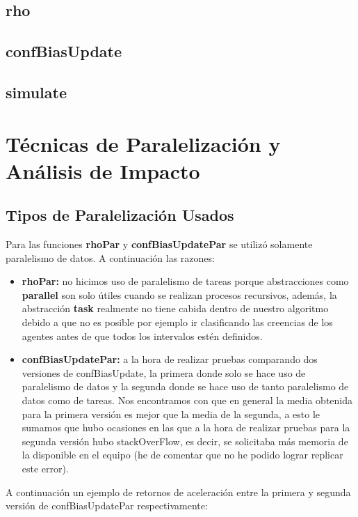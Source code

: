 \documentclass{article}
\begin{document}
    \subsection{rho}

    \subsection{confBiasUpdate}

    \subsection{simulate}

  \section{Técnicas de Paralelización y Análisis de Impacto}

    \subsection{Tipos de Paralelización Usados}
    Para las funciones \textbf{rhoPar} y \textbf{confBiasUpdatePar} se utilizó solamente paralelismo de datos. A continuación  las razones:

    \begin{itemize}
      \item \textbf{rhoPar:} no hicimos uso de paralelismo de tareas porque abstracciones como \textbf{parallel} son solo útiles cuando se realizan procesos recursivos, además, la abstracción \textbf{task} realmente no tiene cabida dentro de nuestro algoritmo debido a que no es posible por ejemplo ir clasificando las creencias de los agentes antes de que todos los intervalos estén definidos.
      \item \textbf{confBiasUpdatePar:} a la hora de realizar pruebas comparando dos versiones de confBiasUpdate, la primera donde solo se hace uso de paralelismo de datos y la segunda donde se hace uso de tanto paralelismo de datos como de tareas. Nos encontramos con que en general la media obtenida para la primera versión es mejor que la media de la segunda, a esto le sumamos que hubo ocasiones en las que a la hora de realizar pruebas para la segunda versión hubo stackOverFlow, es decir, se solicitaba más memoria de la disponible en el equipo (he de comentar que no he podido lograr replicar este error).
    \end{itemize}

    A continuación un ejemplo de retornos de aceleración entre la primera y segunda versión de confBiasUpdatePar respectivamente:
\end{document}
